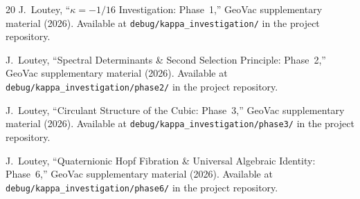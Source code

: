 \documentclass[aps,prl,twocolumn,superscriptaddress]{revtex4-2}
\begin{document}
\begin{thebibliography}{20}
J.~Loutey, ``$\kappa = -1/16$ Investigation: Phase~1,'' GeoVac
supplementary material (2026). Available at
\texttt{debug/kappa\_investigation/} in the project repository.

J.~Loutey, ``Spectral Determinants \& Second Selection Principle:
Phase~2,'' GeoVac supplementary material (2026). Available at
\texttt{debug/kappa\_investigation/phase2/} in the project repository.

J.~Loutey, ``Circulant Structure of the Cubic: Phase~3,'' GeoVac
supplementary material (2026). Available at
\texttt{debug/kappa\_investigation/phase3/} in the project repository.

J.~Loutey, ``Quaternionic Hopf Fibration \& Universal Algebraic
Identity: Phase~6,'' GeoVac supplementary material (2026). Available
at \texttt{debug/kappa\_investigation/phase6/} in the project
repository.

\end{thebibliography}
\end{document}
